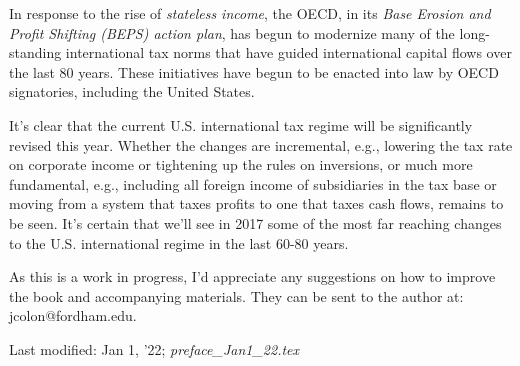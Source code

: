 In response to the rise of \emph{stateless income}, the OECD, in its \emph{Base Erosion and Profit Shifting (BEPS) action plan}, has begun to modernize many of the long-standing international tax norms that have guided international capital flows over the last 80 years.  These initiatives have begun to be enacted into law by OECD signatories, including the United States.

It's clear that the current U.S. international tax regime will be significantly revised this year.  Whether the changes are incremental, e.g., lowering the tax rate on corporate income or tightening up the rules on inversions, or much more fundamental, e.g., including all foreign income of subsidiaries in the tax base or moving from a system that taxes profits to one that taxes cash flows, remains to be seen.  It's certain that we'll see in 2017 some of the most far reaching changes to the U.S. international regime in the last 60-80 years.  

As this is a work in progress, I'd appreciate any suggestions on how to improve the book and accompanying materials.  They can be sent to the author at:  jcolon@fordham.edu.    


\begin{framed}
Last modified:  Jan 1, '22; \emph{preface\_Jan1\_22.tex}
\end{framed}